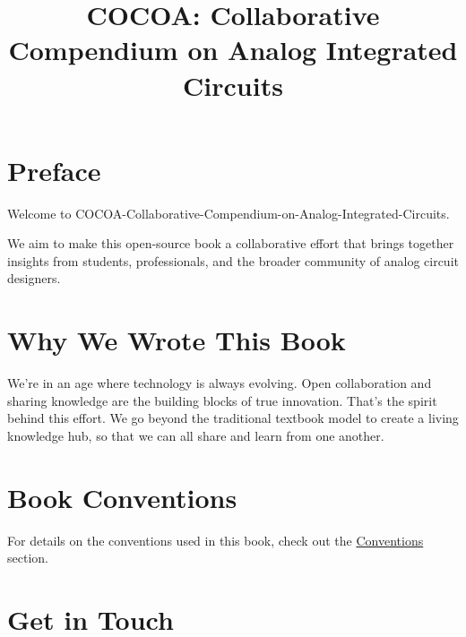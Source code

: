 \documentclass[
  11pt,
  letterpaper,
  abstract]{scrbook}
\title{COCOA: Collaborative Compendium on Analog Integrated Circuits}
\author{}
\date{}
\renewcommand*\contentsname{Table of contents}
\newcommand\contentsname{Table of contents}
\begin{document}
\frontmatter
\maketitle

\renewcommand*\contentsname{Table of contents}
{
\setcounter{tocdepth}{2}
\tableofcontents
}

\mainmatter
\chapter*{Preface}\label{preface}


Welcome to COCOA-Collaborative-Compendium-on-Analog-Integrated-Circuits.

We aim to make this open-source book a collaborative effort that brings
together insights from students, professionals, and the broader
community of analog circuit designers.

\chapter*{Why We Wrote This Book}\label{why-we-wrote-this-book}


We're in an age where technology is always evolving. Open collaboration
and sharing knowledge are the building blocks of true innovation. That's
the spirit behind this effort. We go beyond the traditional textbook
model to create a living knowledge hub, so that we can all share and
learn from one another.

\chapter*{Book Conventions}\label{book-conventions}


For details on the conventions used in this book, check out the
\href{./contents/conventions.qmd}{Conventions} section.

\chapter*{Get in Touch}\label{get-in-touch}
\end{document}
